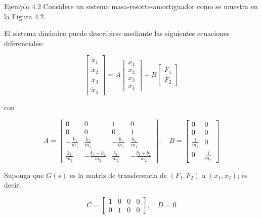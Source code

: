 Ejemplo 4.2 Considere un sistema masa-resorte-amortiguador como se muestra en la Figura 4.2.


El sistema dinámico puede describirse mediante las siguientes ecuaciones diferenciales:

$$
\left[\begin{array}{c}
\dot{x}_{1} \\
\dot{x}_{2} \\
\dot{x}_{3} \\
\dot{x}_{4}
\end{array}\right]=A\left[\begin{array}{l}
x_{1} \\
x_{2} \\
x_{3} \\
x_{4}
\end{array}\right]+B\left[\begin{array}{l}
F_{1} \\
F_{2}
\end{array}\right]
$$


con

$$
A=\left[\begin{array}{cccc}
0 & 0 & 1 & 0 \\
0 & 0 & 0 & 1 \\
-\frac{k_{1}}{m_{1}} & \frac{k_{1}}{m_{1}} & -\frac{b_{1}}{m_{1}} & \frac{b_{1}}{m_{1}} \\
\frac{k_{1}}{m_{2}} & -\frac{k_{1}+k_{2}}{m_{2}} & \frac{b_{1}}{m_{2}} & -\frac{b_{1}+b_{2}}{m_{2}}
\end{array}\right], \quad B=\left[\begin{array}{cc}
0 & 0 \\
0 & 0 \\
\frac{1}{m_{1}} & 0 \\
0 & \frac{1}{m_{2}}
\end{array}\right]
$$

Suponga que $G(s)$ es la matriz de transferencia de $\left(F_{1}, F_{2}\right)$ a $\left(x_{1}, x_{2}\right)$; es decir,

$$
C=\left[\begin{array}{llll}
1 & 0 & 0 & 0 \\
0 & 1 & 0 & 0
\end{array}\right], \quad D=0
$$

